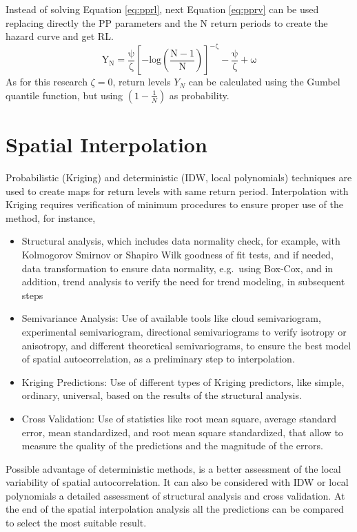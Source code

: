 \documentclass[12pt,oneside]{reedthesis}
\begin{document}
Instead of solving Equation \eqref{eq:pprl}, next Equation \eqref{eq:pprv} can be used replacing directly the PP parameters and the N return periods to create the hazard curve and get RL.
\begin{equation}
  \mathrm{
Y_N=\frac{\psi}{\zeta}\left[-log\left(\frac{N-1}{N}\right)\right]^{-\zeta}-\frac{\psi}{\zeta}+\omega
        }
  \label{eq:pprv}
\end{equation}
As for this research \(\zeta = 0\), return levels \(Y_N\) can be calculated using the Gumbel quantile function, but using \((1-\frac{1}{N})\) as probability.

\hypertarget{si}{%
\section{Spatial Interpolation}\label{si}}

Probabilistic (Kriging) and deterministic (IDW, local polynomials) techniques are used to create maps for return levels with same return period. Interpolation with Kriging requires verification of minimum procedures to ensure proper use of the method, for instance,
\begin{itemize}
\item
  Structural analysis, which includes data normality check, for example, with Kolmogorov Smirnov or Shapiro Wilk goodness of fit tests, and if needed, data transformation to ensure data normality, e.g.~using Box-Cox, and in addition, trend analysis to verify the need for trend modeling, in subsequent steps
\item
  Semivariance Analysis: Use of available tools like cloud semivariogram, experimental semivariogram, directional semivariograms to verify isotropy or anisotropy, and different theoretical semivariograms, to ensure the best model of spatial autocorrelation, as a preliminary step to interpolation.
\item
  Kriging Predictions: Use of different types of Kriging predictors, like simple, ordinary, universal, based on the results of the structural analysis.
\item
  Cross Validation: Use of statistics like root mean square, average standard error, mean standardized, and root mean square standardized, that allow to measure the quality of the predictions and the magnitude of the errors.
\end{itemize}
Possible advantage of deterministic methods, is a better assessment of the local variability of spatial autocorrelation. It can also be considered with IDW or local polynomials a detailed assessment of structural analysis and cross validation. At the end of the spatial interpolation analysis all the predictions can be compared to select the most suitable result.
\end{document}
